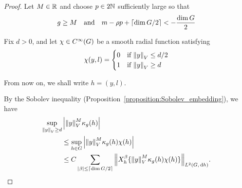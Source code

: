 \begin{proof}
    Let $M \in \mathbb{R}$ and choose $p \in 2 \mathbb{N}$ sufficiently large so that
    \begin{align*}
        g \geq M \quad \text{and} \quad
        m - \rho p + \lceil\dim G / 2\rceil < -\frac {\dim G} 2
    \end{align*}

    Fix $d > 0$,
    and let $\chi \in {C^\infty(G)}$ be a smooth radial function satisfying
    \begin{align*}
        \chi(y, l) =
        \begin{cases}
            0 & \text{if } {\left\| y \right\|}_{V} \leq d/2\\
            1 & \text{if } {\left\| y \right\|}_{V} \geq d
        \end{cases}
    \end{align*}

    From now on, we shall write $h = (y, l)$.

    By the Sobolev inequality (Proposition~\ref{proposition:Sobolev_embedding}),
    we have
    \begin{align}
        \sup_{\norm y \geq d} &\abs{\norm y^M \kappa_g(h)} \notag\\
        &\leq \sup_{h \in \Group} \abs{\norm y^M \kappa_g(h) \chi(h)} \notag\\
        &\leq C \sum_{\abs \beta \leq \Ceiling {\dim \Group / 2}} \norm [\Lebesgue 2 {\Group, \dd h}] {\LeftDifferentialOperator [h] \beta \{\norm y^M \kappa_g(h) \chi(h)\}}.
        \label{eq:Schwartz_decay_of_kernel:first_estimate}
    \end{align}


\end{proof}
